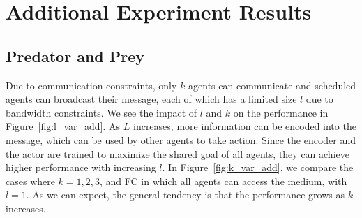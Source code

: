 \newpage
\section{Additional Experiment Results}
\label{sec:additional-results}

\subsection{Predator and Prey}




 Due to communication constraints, only $k$ agents can
communicate and scheduled agents can broadcast their message, each of
which has a limited size $l$ due to bandwidth constraints. We see the
impact of $l$ and $k$ on the performance in
Figure~\ref{fig:l_var_add}. As $L$ increases, more information can be
encoded into the message, which can be used by other agents to take
action. Since the encoder and the actor are trained to maximize the
shared goal of all agents, they can achieve higher performance with
increasing $l$. In Figure~\ref{fig:k_var_add}, we compare the cases
where $k=1,2,3$, and FC in which all agents can access the medium,
with $l=1$. As we can expect, the general tendency is that the
performance grows as $k$ increases.


